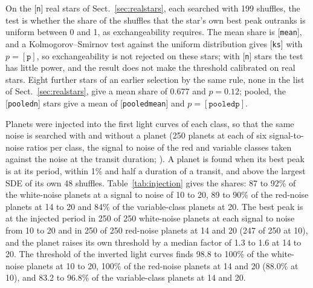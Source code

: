 \documentclass{aastex631}
\providecommand{\Thr}[1]{[\texttt{#1}]}
\begin{document}
On the \Thr{n} real stars of Sect.~\ref{sec:realstars}, each searched with 199 shuffles, the test is whether the share of the shuffles that the star's own best peak outranks is uniform between 0 and 1, as exchangeability requires. The mean share is \Thr{mean}, and a Kolmogorov--Smirnov test against the uniform distribution gives \Thr{ks} with $p=\Thr{p}$, so exchangeability is not rejected on these stars; with \Thr{n} stars the test has little power, and the result does not make the threshold calibrated on real stars. Eight further stars of an earlier selection by the same rule, none in the list of Sect.~\ref{sec:realstars}, give a mean share of 0.677 and $p=0.12$; pooled, the \Thr{pooledn} stars give a mean of \Thr{pooledmean} and $p=\Thr{pooledp}$.

Planets were injected into the first light curves of each class, so that the same noise is searched with and without a planet (250 planets at each of six signal-to-noise ratios per class, the signal to noise of the red and variable classes taken against the noise at the transit duration; \citealt{Pont2006}). A planet is found when its best peak is at its period, within 1\% and half a duration of a transit, and above the largest SDE of its own 48 shuffles. Table~\ref{tab:injection} gives the shares: 87 to 92\% of the white-noise planets at a signal to noise of 10 to 20, 89 to 90\% of the red-noise planets at 14 to 20 and 84\% of the variable-class planets at 20. The best peak is at the injected period in 250 of 250 white-noise planets at each signal to noise from 10 to 20 and in 250 of 250 red-noise planets at 14 and 20 (247 of 250 at 10), and the planet raises its own threshold by a median factor of 1.3 to 1.6 at 14 to 20. The threshold of the inverted light curves finds 98.8 to 100\% of the white-noise planets at 10 to 20, 100\% of the red-noise planets at 14 and 20 (88.0\% at 10), and 83.2 to 96.8\% of the variable-class planets at 14 and 20.

\begin{table}[htbp]
\centering
\caption{Injected planets: the planets (250 in each row), those whose best peak is at the injected period (within 1\%), those at a harmonic, and the share found above the threshold of their own shuffles and of their inverted shuffles, with the 95\% Wilson interval.}\label{tab:injection}
\footnotesize

\end{table}

\FloatBarrier
\end{document}
